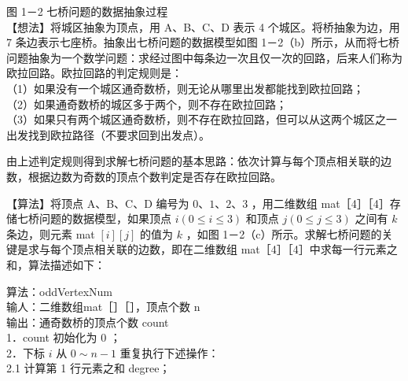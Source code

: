 \documentclass[10pt]{article}
\begin{document}
图 1－2 七桥问题的数据抽象过程\\
【想法】将城区抽象为顶点，用 A、B、C、D 表示 4 个城区。将桥抽象为边，用 7 条边表示七座桥。抽象出七桥问题的数据模型如图 1－2（b）所示，从而将七桥问题抽象为一个数学问题：求经过图中每条边一次且仅一次的回路，后来人们称为欧拉回路。欧拉回路的判定规则是：\\
（1）如果没有一个城区通奇数桥，则无论从哪里出发都能找到欧拉回路；\\
（2）如果通奇数桥的城区多于两个，则不存在欧拉回路；\\
（3）如果只有两个城区通奇数桥，则不存在欧拉回路，但可以从这两个城区之一出发找到欧拉路径（不要求回到出发点）。

由上述判定规则得到求解七桥问题的基本思路：依次计算与每个顶点相关联的边数，根据边数为奇数的顶点个数判定是否存在欧拉回路。

【算法】将顶点 A、B、C、D 编号为 $0 、 1 、 2 、 3$ ，用二维数组 mat［4］［4］存储七桥问题的数据模型，如果顶点 $i(0 \leqslant i \leqslant 3)$ 和顶点 $j(0 \leqslant j \leqslant 3)$ 之间有 $k$ 条边，则元素 mat $[i][j]$ 的值为 $k$ ，如图 1－2（c）所示。求解七桥问题的关键是求与每个顶点相关联的边数，即在二维数组 mat［4］［4］中求每一行元素之和，算法描述如下：

算法：oddVertexNum\\
输人：二维数组mat［］［］，顶点个数 n\\
输出：通奇数桥的顶点个数 count\\
1．count 初始化为 0 ；\\
2．下标 $i$ 从 $0 \sim n-1$ 重复执行下述操作：\\
2.1 计算第 1 行元素之和 degree；
\end{document}
